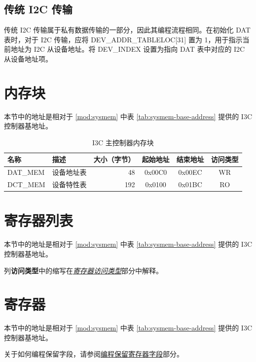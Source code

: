 \documentclass[main\_\_CN.tex]{subfiles}
\begin{document}
\subsection{传统 I2C 传输}
传统 I2C 传输属于私有数据传输的一部分，因此其编程流程相同。在初始化 DAT 表时，对于 I2C 传输，应将 DEV\_ADDR\_TABLELOC[31] 置为 1，用于指示当前地址为 I2C 从设备地址。将 DEV\_INDEX 设置为指向 DAT 表中对应的 I2C 从设备地址项。


\section{内存块}

本节中的地址是相对于 \ref{mod:sysmem} \textit{} 中表 \ref{tab:sysmem-base-address} 提供的 I3C 控制器基地址。

\begin{longtable}{ | p{3cm} | p{3cm} | r | c | c | c | }
\caption{I3C 主控制器内存块} \label{dat-dct}
\\ \hline
\rowcolor{lightgray}
名称 & 描述  &  大小（字节）  &  起始地址  &  结束地址  &  访问类型   \\ \hline
DAT\_MEM\label{TBD1} & 设备地址表  &  48 &  0x00C0  &  0x00EC  &  WR  \\ \hline
DCT\_MEM\label{TBD2} & 设备特性表  &   192  &  0x0100  &  0x01BC  &  RO  \\  \hline
\end{longtable}


\newpage
\hypertarget{i3c-reg-summ}{}
\section{寄存器列表}
\label{sec:i3c-reg-summ}


本节中的地址是相对于 \ref{mod:sysmem} \textit{} 中表 \ref{tab:sysmem-base-address} 提供的 I3C 控制器基地址。

列\textbf{访问类型}中的缩写在\hyperref[glossary-access-types]{\textit{寄存器访问类型}}部分中解释。




\newpage
\section{寄存器}

本节中的地址是相对于 \ref{mod:sysmem} \textit{} 中表 \ref{tab:sysmem-base-address} 提供的 I3C 控制器基地址。

关于如何编程保留字段，请参阅\hyperref[programming-reserved-field]{编程保留寄存器字段}部分。




\end{document}
